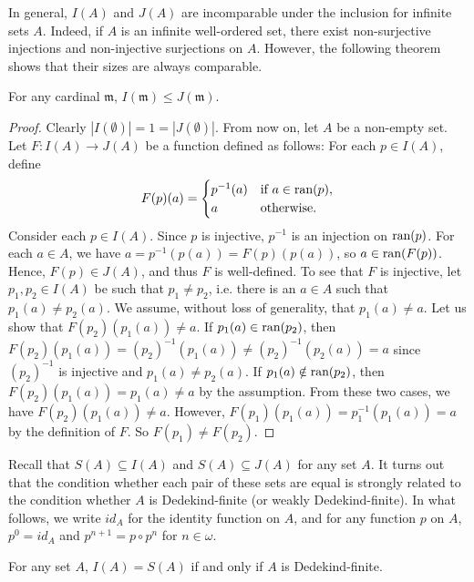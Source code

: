 In general, $I(A)$ and $J(A)$ are incomparable under the inclusion for infinite sets $A$. Indeed, if $A$ is an infinite well-ordered set, there exist non-surjective injections and non-injective surjections on $A$. However, the following theorem shows that their sizes are always comparable.

\begin{theorem}\label{IJ}
For any cardinal $\mathfrak{m}$,   $I(\mathfrak{m}) \leq J(\mathfrak{m})$.
\end{theorem}

\begin{proof}
Clearly $|I(\emptyset)| = 1 = |J(\emptyset)|$. From now on, let $A$ be a non-empty set. Let $F : I(A) \to J(A)$ be a function defined as follows: For each $p\in I(A)$, define
\[
F(p)(a)=
\begin{cases}
p^{-1}(a) &\text{if } a \in \textup{ran}(p),\\
a &\text{otherwise}.
\end{cases}
\]
Consider each $p \in I(A)$. Since $p$ is injective, $p^{-1}$ is an injection on $\textup{ran}(p)$. For each $a \in A$, we have  $a = p^{-1}(p(a)) = F(p)(p(a))$, so $a \in \textup{ran}(F(p))$. Hence, $F(p) \in J(A)$, and thus $F$ is well-defined. To see that $F$ is injective, let $p_{1},p_{2} \in I(A)$ be such that $p_{1} \neq p_{2}$, i.e. there is an $a \in A$ such that $p_{1}(a) \neq p_{2}(a)$. We assume, without loss of generality, that $p_{1}(a) \neq a$. Let us show that $F(p_{2})(p_{1}(a)) \neq a$. If $p_{1}(a) \in \textup{ran}(p_{2})$, then $F(p_{2})(p_{1}(a)) = (p_{2})^{-1}(p_{1}(a)) \neq (p_{2})^{-1}(p_{2}(a)) = a$ since $(p_{2})^{-1}$ is injective and $p_{1}(a) \neq p_{2}(a)$. If $p_{1}(a) \notin \textup{ran}(p_{2})$, then $F(p_{2})(p_{1}(a)) = p_{1}(a) \neq a$ by the assumption. From these two cases, we have $F(p_{2})(p_{1}(a)) \neq a$. However, $F(p_{1})(p_{1}(a)) = p_{1}^{-1}(p_{1}(a)) = a$ by the definition of $F$. So $F(p_{1}) \neq F(p_{2})$. 
\end{proof}

Recall that $S(A) \subseteq I(A)$ and $S(A) \subseteq J(A)$ for any set $A$. It turns out that the condition whether each pair of these sets are equal is strongly related to the condition whether $A$ is Dedekind-finite (or weakly Dedekind-finite). In what follows, we write $id_A$ for the identity function on $A$, and for any function $p$ on $A$, $p^0 = id_A$ and $p^{n+1} = p \circ p^n$ for $n\in\omega$.

\begin{theorem}\label{IS}
For any set $A$, $I(A)=S(A)$ if and only if $A$ is Dedekind-finite.
\end{theorem}

